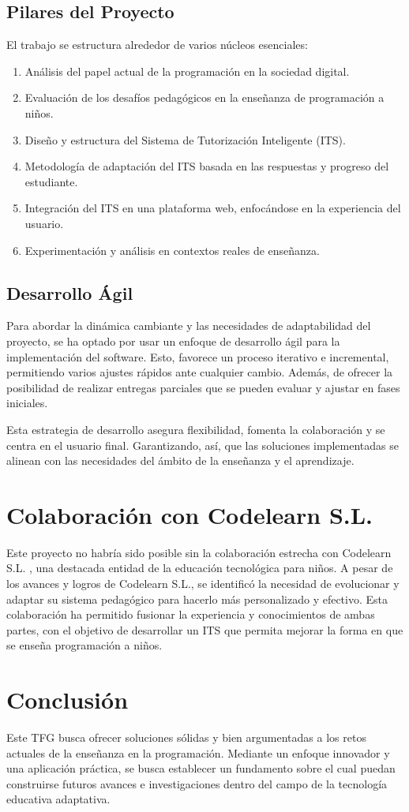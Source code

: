 \subsection{Pilares del Proyecto}
El trabajo se estructura alrededor de varios núcleos esenciales:

\begin{enumerate}
\item Análisis del papel actual de la programación en la sociedad digital.
\item Evaluación de los desafíos pedagógicos en la enseñanza de programación a niños.
\item Diseño y estructura del Sistema de Tutorización Inteligente (ITS).
\item Metodología de adaptación del ITS basada en las respuestas y progreso del estudiante.
\item Integración del ITS en una plataforma web, enfocándose en la experiencia del usuario.
\item Experimentación y análisis en contextos reales de enseñanza.
\end{enumerate}

\subsection{Desarrollo Ágil}
Para abordar la dinámica cambiante y las necesidades de adaptabilidad del proyecto, se ha optado por usar un enfoque de desarrollo ágil para la implementación del software. Esto, favorece un proceso iterativo e incremental, permitiendo varios ajustes rápidos ante cualquier cambio. Además, de ofrecer la posibilidad de realizar entregas parciales que se pueden evaluar y ajustar en fases iniciales.

Esta estrategia de desarrollo asegura flexibilidad, fomenta la colaboración y se centra en el usuario final. Garantizando, así, que las soluciones implementadas se alinean con las necesidades del ámbito de la enseñanza y el aprendizaje.

\section{Colaboración con Codelearn S.L.}
Este proyecto no habría sido posible sin la colaboración estrecha con Codelearn S.L.  \cite{codelearn}, una destacada entidad de la educación tecnológica para niños. A pesar de los avances y logros de Codelearn S.L., se identificó la necesidad de evolucionar y adaptar su sistema pedagógico para hacerlo más personalizado y efectivo. Esta colaboración ha permitido fusionar la experiencia y conocimientos de ambas partes, con el objetivo de desarrollar un ITS que permita mejorar la forma en que se enseña programación a niños.

\section{Conclusión}
Este TFG busca ofrecer soluciones sólidas y bien argumentadas a los retos actuales de la enseñanza en la programación. Mediante un enfoque innovador y una aplicación práctica, se busca establecer un fundamento sobre el cual puedan construirse futuros avances e investigaciones dentro del campo de la tecnología educativa adaptativa.
